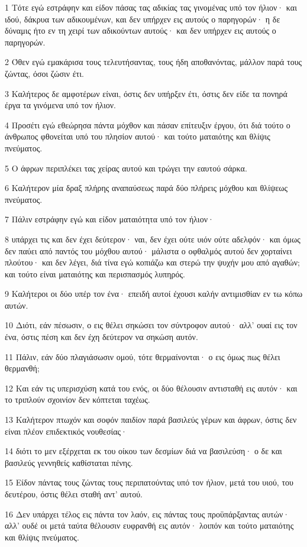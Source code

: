 \par 1 Τότε εγώ εστράφην και είδον πάσας τας αδικίας τας γινομένας υπό τον ήλιον· και ιδού, δάκρυα των αδικουμένων, και δεν υπήρχεν εις αυτούς ο παρηγορών· η δε δύναμις ήτο εν τη χειρί των αδικούντων αυτούς· και δεν υπήρχεν εις αυτούς ο παρηγορών.
\par 2 Όθεν εγώ εμακάρισα τους τελευτήσαντας, τους ήδη αποθανόντας, μάλλον παρά τους ζώντας, όσοι ζώσιν έτι.
\par 3 Καλήτερος δε αμφοτέρων είναι, όστις δεν υπήρξεν έτι, όστις δεν είδε τα πονηρά έργα τα γινόμενα υπό τον ήλιον.
\par 4 Προσέτι εγώ εθεώρησα πάντα μόχθον και πάσαν επίτευξιν έργου, ότι διά τούτο ο άνθρωπος φθονείται υπό του πλησίον αυτού· και τούτο ματαιότης και θλίψις πνεύματος.
\par 5 Ο άφρων περιπλέκει τας χείρας αυτού και τρώγει την εαυτού σάρκα.
\par 6 Καλήτερον μία δραξ πλήρης αναπαύσεως παρά δύο πλήρεις μόχθου και θλίψεως πνεύματος.
\par 7 Πάλιν εστράφην εγώ και είδον ματαιότητα υπό τον ήλιον·
\par 8 υπάρχει τις και δεν έχει δεύτερον· ναι, δεν έχει ούτε υιόν ούτε αδελφόν· και όμως δεν παύει από παντός του μόχθου αυτού· μάλιστα ο οφθαλμός αυτού δεν χορταίνει πλούτου· και δεν λέγει, διά τίνα εγώ κοπιάζω και στερώ την ψυχήν μου από αγαθών; και τούτο είναι ματαιότης και περισπασμός λυπηρός.
\par 9 Καλήτεροι οι δύο υπέρ τον ένα· επειδή αυτοί έχουσι καλήν αντιμισθίαν εν τω κόπω αυτών.
\par 10 Διότι, εάν πέσωσιν, ο εις θέλει σηκώσει τον σύντροφον αυτού· αλλ' ουαί εις τον ένα, όστις πέση και δεν έχη δεύτερον να σηκώση αυτόν.
\par 11 Πάλιν, εάν δύο πλαγιάσωσιν ομού, τότε θερμαίνονται· ο εις όμως πως θέλει θερμανθή;
\par 12 Και εάν τις υπερισχύση κατά του ενός, οι δύο θέλουσιν αντισταθή εις αυτόν· και το τριπλούν σχοινίον δεν κόπτεται ταχέως.
\par 13 Καλήτερον πτωχόν και σοφόν παιδίον παρά βασιλεύς γέρων και άφρων, όστις δεν είναι πλέον επιδεκτικός νουθεσίας·
\par 14 διότι το μεν εξέρχεται εκ του οίκου των δεσμίων διά να βασιλεύση· ο δε και βασιλεύς γεννηθείς καθίσταται πένης.
\par 15 Είδον πάντας τους ζώντας τους περιπατούντας υπό τον ήλιον, μετά του υιού, του δευτέρου, όστις θέλει σταθή αντ' αυτού.
\par 16 Δεν υπάρχει τέλος εις πάντα τον λαόν, εις πάντας τους προϋπάρξαντας αυτών· αλλ' ουδέ οι μετά ταύτα θέλουσιν ευφρανθή εις αυτόν· λοιπόν και τούτο ματαιότης και θλίψις πνεύματος.


